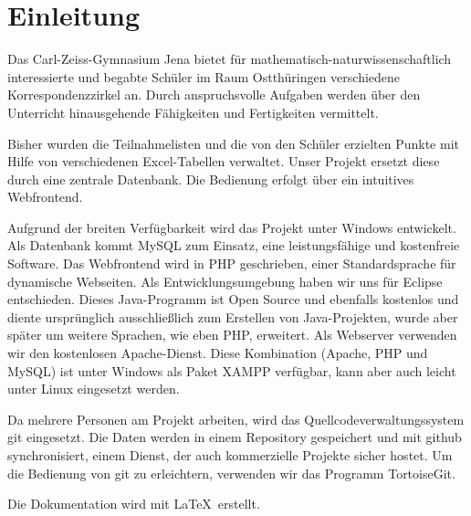 \chapter{Einleitung}
Das Carl-Zeiss-Gymnasium Jena bietet für mathematisch-naturwissenschaftlich interessierte und begabte Schüler im Raum Ostthüringen verschiedene Korrespondenzzirkel an. Durch anspruchsvolle Aufgaben werden über den Unterricht hinausgehende Fähigkeiten und Fertigkeiten vermittelt. \cite{Korrespondenzzirkel}

Bisher wurden die Teilnahmelisten und die von den Schüler erzielten Punkte mit Hilfe von verschiedenen Excel-Tabellen verwaltet. Unser Projekt ersetzt diese durch eine zentrale Datenbank. Die Bedienung erfolgt über ein intuitives Webfrontend. 

Aufgrund der breiten Verfügbarkeit wird das Projekt unter Windows entwickelt. Als Datenbank kommt MySQL zum Einsatz, eine leistungsfähige und kostenfreie Software. Das Webfrontend wird in PHP geschrieben, einer Standardsprache für dynamische Webseiten. Als Entwicklungsumgebung haben wir uns für Eclipse entschieden. Dieses Java-Programm ist Open Source und ebenfalls kostenlos und diente ursprünglich ausschließlich zum Erstellen von Java-Projekten, wurde aber später um weitere Sprachen, wie eben PHP, erweitert. Als Webserver verwenden wir den kostenlosen Apache-Dienst. Diese Kombination (Apache, PHP und MySQL) ist unter Windows als Paket XAMPP verfügbar, kann aber auch leicht unter Linux eingesetzt werden. \cite{Apache} \cite{Eclipse} \cite{MySql} 

Da mehrere Personen am Projekt arbeiten, wird das Quellcodeverwaltungssystem git eingesetzt. Die Daten werden in einem Repository gespeichert und mit github synchronisiert, einem Dienst, der auch kommerzielle Projekte sicher hostet. Um die Bedienung von git zu erleichtern, verwenden wir das Programm TortoiseGit. \cite{github}

Die Dokumentation wird mit \LaTeX \ erstellt.
